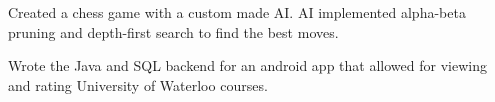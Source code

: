 \documentclass[letterpaper]{deedy-resume-modified} %
\begin{document}
\begin{minipage}[t]{0.66\textwidth}

Created a chess game with a custom made AI.   AI implemented alpha-beta pruning and depth-first search to find the best moves.

\sectionspace %



Wrote the Java and SQL backend for an android app that allowed for viewing and rating University of Waterloo courses.

\sectionspace %

\end{minipage} %

\end{document}
